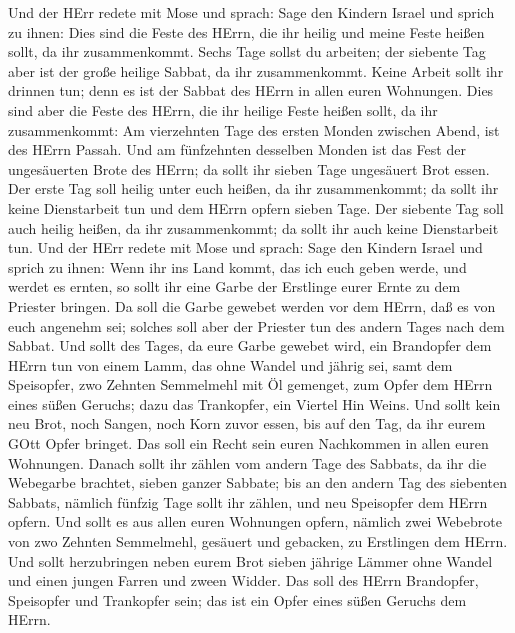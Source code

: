  Und der HErr redete mit Mose und sprach:  Sage
den Kindern Israel und sprich zu ihnen: Dies sind die Feste des HErrn,
die ihr heilig und meine Feste heißen sollt, da ihr zusammenkommt.
 Sechs Tage sollst du arbeiten; der siebente Tag aber ist
der große heilige Sabbat, da ihr zusammenkommt. Keine Arbeit sollt ihr
drinnen tun; denn es ist der Sabbat des HErrn in allen euren Wohnungen.
 Dies sind aber die Feste des HErrn, die ihr heilige Feste
heißen sollt, da ihr zusammenkommt:  Am vierzehnten Tage des
ersten Monden zwischen Abend, ist des HErrn Passah.  Und am
fünfzehnten desselben Monden ist das Fest der ungesäuerten Brote des
HErrn; da sollt ihr sieben Tage ungesäuert Brot essen.  Der
erste Tag soll heilig unter euch heißen, da ihr zusammenkommt; da sollt
ihr keine Dienstarbeit tun  und dem HErrn opfern sieben
Tage. Der siebente Tag soll auch heilig heißen, da ihr zusammenkommt; da
sollt ihr auch keine Dienstarbeit tun.  Und der HErr redete
mit Mose und sprach:  Sage den Kindern Israel und sprich zu
ihnen: Wenn ihr ins Land kommt, das ich euch geben werde, und werdet es
ernten, so sollt ihr eine Garbe der Erstlinge eurer Ernte zu dem
Priester bringen.  Da soll die Garbe gewebet werden vor dem
HErrn, daß es von euch angenehm sei; solches soll aber der Priester tun
des andern Tages nach dem Sabbat.  Und sollt des Tages, da
eure Garbe gewebet wird, ein Brandopfer dem HErrn tun von einem Lamm,
das ohne Wandel und jährig sei,  samt dem Speisopfer, zwo
Zehnten Semmelmehl mit Öl gemenget, zum Opfer dem HErrn eines süßen
Geruchs; dazu das Trankopfer, ein Viertel Hin Weins.  Und
sollt kein neu Brot, noch Sangen, noch Korn zuvor essen, bis auf den
Tag, da ihr eurem GOtt Opfer bringet. Das soll ein Recht sein euren
Nachkommen in allen euren Wohnungen.  Danach sollt ihr
zählen vom andern Tage des Sabbats, da ihr die Webegarbe brachtet,
sieben ganzer Sabbate;  bis an den andern Tag des siebenten
Sabbats, nämlich fünfzig Tage sollt ihr zählen, und neu Speisopfer dem
HErrn opfern.  Und sollt es aus allen euren Wohnungen
opfern, nämlich zwei Webebrote von zwo Zehnten Semmelmehl, gesäuert und
gebacken, zu Erstlingen dem HErrn.  Und sollt herzubringen
neben eurem Brot sieben jährige Lämmer ohne Wandel und einen jungen
Farren und zween Widder. Das soll des HErrn Brandopfer, Speisopfer und
Trankopfer sein; das ist ein Opfer eines süßen Geruchs dem HErrn.
